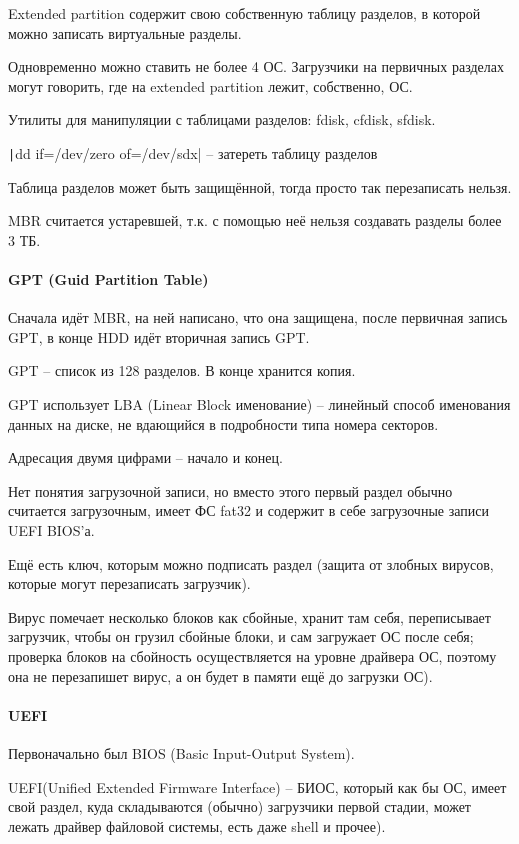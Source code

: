 \documentclass[a4paper,10pt]{article}
\begin{document}
Extended partition содержит свою собственную таблицу разделов, в которой можно записать виртуальные разделы.

Одновременно можно ставить не более 4 ОС. Загрузчики на первичных разделах могут говорить, где на extended partition лежит, собственно, ОС.

Утилиты для манипуляции с таблицами разделов: fdisk, cfdisk, sfdisk.

\texttt|dd if=/dev/zero of=/dev/sdx|  -- затереть таблицу разделов

Таблица разделов может быть защищённой, тогда просто так перезаписать нельзя.

MBR считается устаревшей, т.к. с помощью неё нельзя создавать разделы более 3 ТБ.

\paragraph{GPT (Guid Partition Table)}
Сначала идёт MBR, на ней написано, что она защищена, после первичная запись GPT, в конце HDD идёт вторичная запись GPT.

GPT -- список из 128 разделов. В конце хранится копия.

GPT использует LBA (Linear Block именование) -- линейный способ именования данных на диске, не вдающийся в подробности типа номера секторов.

Адресация двумя цифрами -- начало и конец.

Нет понятия загрузочной записи, но вместо этого первый раздел обычно считается загрузочным, имеет ФС fat32 и содержит в себе загрузочные записи UEFI BIOS'а.

Ещё есть ключ, которым можно подписать раздел (защита от злобных вирусов, которые могут перезаписать загрузчик).

Вирус помечает несколько блоков как сбойные, хранит там себя, переписывает загрузчик, чтобы он грузил сбойные блоки, и сам загружает ОС после себя; проверка блоков на сбойность осуществляется на уровне драйвера ОС, поэтому она не перезапишет вирус, а он будет в памяти ещё до загрузки ОС).

\paragraph{UEFI}
Первоначально был BIOS (Basic Input-Output System).

UEFI(Unified Extended Firmware Interface) -- БИОС, который как бы ОС, имеет свой раздел, куда складываются (обычно) загрузчики первой стадии, может лежать драйвер файловой системы, есть даже shell и прочее).
\end{document}
